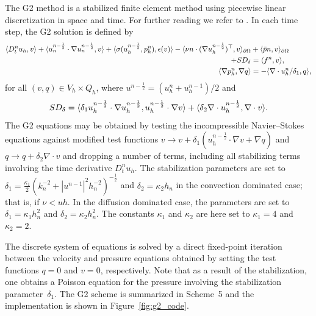 The G2 method is a stabilized finite element method using piecewise
linear discretization in space and time. For further reading we refer
to \citet{HoffmanJohnson2007}. In each time step, the G2 solution is
defined by
\begin{equation}
  \begin{split}
    \renni{v}{D_t^n u_h}
    + \renni{v}{u_n^{n-\frac{1}{2}} \cdot \nabla u_n^{n-\frac{1}{2}}}
    + \renni{\epsilon(v)}{\sigma(u_h^{n-\frac{1}{2}}, p_h^n)}
    - \renni{v}{\nu n \cdot (\nabla u_h^{n-\frac{1}{2}})^{\top}}_{\partial\Omega}
    &+ \renni{v}{\bar{p} n}_{\partial\Omega} \\
    + SD_{\delta}
    &= \renni{v}{f^n}, \\
    \renni{\nabla q}{\nabla p_h^n} &= - \renni{q}{\nabla \cdot u_h^n/\delta_1},
  \end{split}
\end{equation}
for all $(v, q) \in V_h \times Q_h$, where $u^{n-\frac{1}{2}} =
({u}^{n}_h + {u}^{n-1}_h) / 2$ and
\begin{equation}
  SD_{\delta}
  = \renni{u_h^{n-\frac{1}{2}} \cdot \nabla v}{\delta_1 u_h^{n-\frac{1}{2}} \cdot \nabla u_h^{n-\frac{1}{2}}}
  + \renni{\nabla \cdot v}{\delta_2 \nabla \cdot u_h^{n-\frac{1}{2}}}.
\end{equation}
The G2 equations may be obtained by testing the incompressible
Navier--Stokes equations against modified test functions $v
\rightarrow v + \delta_1 (u_h^{n-\frac{1}{2}} \cdot \nabla v + \nabla q)$ and
$q \rightarrow q + \delta_2 \nabla \cdot v$ and dropping a number of
terms, including all stabilizing terms involving the time derivative
$D_t^n u_h$. The stabilization parameters are set to $\delta_{1} =
\frac{\kappa_1}{2}(k_{n}^{-2} +
|u^{n-1}|^{2}h_{n}^{-2})^{-\frac{1}{2}}$ and $\delta_{2}= \kappa_2
h_n$ in the convection dominated case; that is, if $\nu < uh$. In the
diffusion dominated case, the parameters are set to $\delta_{1} =
\kappa_1 h_{n}^2$ and $\delta_{2} = \kappa_2 h_{n}^2$. The constants
$\kappa_1$ and $\kappa_2$ are here set to $\kappa_1 = 4$ and $\kappa_2
= 2$.

The discrete system of equations is solved by a direct fixed-point
iteration between the velocity and pressure equations obtained by
setting the test functions $q = 0$ and $v = 0$, respectively. Note that
as a result of the stabilization, one obtains a Poisson equation for
the pressure involving the stabilization parameter~$\delta_1$. The G2
scheme is summarized in Scheme~5 and the implementation is shown in
Figure~\ref{fig:g2_code}.

